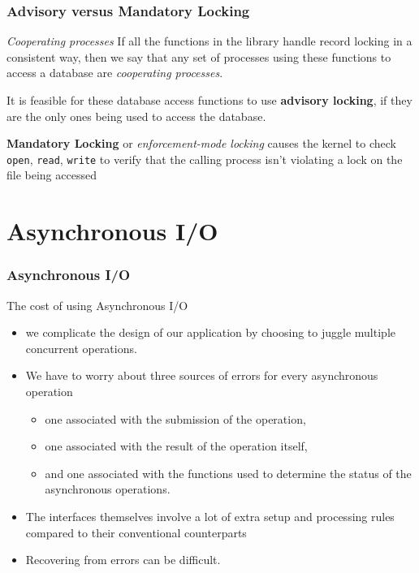 \documentclass[newPxFont,sthlmFooter,nooffset]{beamer}
\begin{document}
\begin{frame}[t]
  \frametitle{Advisory versus Mandatory Locking}
  \begin{block}{\textit{Cooperating processes}}
    If all the functions in the library handle record locking in a consistent way, then we say that any set of processes using these functions to access a database are \textit{cooperating processes}.
  \end{block}

It is feasible for these database access functions to use \textbf{advisory locking},
 if they are the only ones being used to access the database.
\bigskip

\textbf{Mandatory Locking} or \textit{enforcement-mode locking} causes the kernel to check \texttt{open}, \texttt{read}, \texttt{write} to verify that the calling process isn't violating a lock on the file being accessed


\end{frame}


\section{Asynchronous I/O}

\begin{frame}[t]
  \frametitle{Asynchronous I/O}
The cost of using Asynchronous I/O
\begin{itemize}
\item we complicate the design of our application by choosing to
  juggle multiple concurrent operations.
\item We have to worry about three sources of errors for every asynchronous operation
  \begin{itemize}
  \item one associated with the submission of the operation,
  \item one associated with the result of the operation itself,
  \item and one associated with the functions used to determine the
    status of the asynchronous operations.
  \end{itemize}
\item The interfaces themselves involve a lot of extra setup and processing rules compared to their conventional counterparts
\item Recovering from errors can be difficult.
\end{itemize}

\end{frame}
\end{document}
